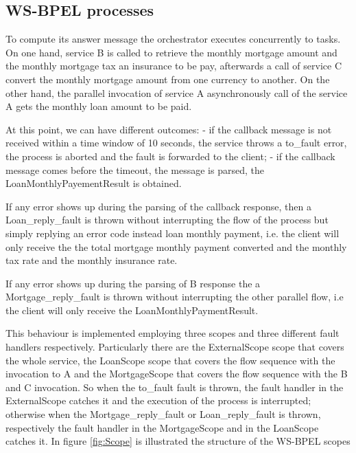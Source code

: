 \documentclass[
10pt, %
a4paper, %
oneside, %
headinclude,footinclude, %
BCOR5mm, %
]{scrartcl}
\begin{document}
\subsection{WS-BPEL processes}
To compute its answer message the orchestrator executes concurrently to
tasks. On one hand, service B is called to retrieve the monthly mortgage
amount and the monthly mortgage tax an insurance to be pay, afterwards a
call of service C convert the monthly mortgage amount from one currency
to another. On the other hand, the parallel invocation of service A asynchronously
call of the service A gets the monthly loan amount to be paid.


At this point, we can have different outcomes: - if the callback message
is not received within a time window of 10 seconds, the service throws
a to\_fault error, the process is aborted and the fault is forwarded to the
client; - if the callback message comes before the timeout, the message is
parsed, the LoanMonthlyPayementResult is obtained. 

If any error shows up during the parsing of the callback response, then a Loan\_reply\_fault is
thrown without interrupting the flow of the process but simply replying
an error code instead loan monthly payment, i.e. the client will only receive
the the total mortgage monthly payment converted and the monthly tax rate
and the monthly insurance rate.


If any error shows up during the parsing of B response the a Mortgage\_reply\_fault
is thrown without interrupting the other parallel flow, i.e the client will only
receive the LoanMonthlyPaymentResult.


This behaviour is implemented employing three scopes and three different
fault handlers respectively. Particularly there are the ExternalScope
scope that covers the whole service, the LoanScope scope that covers the
flow sequence with the invocation to A and the MortgageScope that covers
the flow sequence with the B and C invocation. So when the to\_fault fault
is thrown, the fault handler in the ExternalScope catches it and the execution
of the process is interrupted; otherwise when the Mortgage\_reply\_fault
or Loan\_reply\_fault is thrown, respectively the fault handler in the MortgageScope
and in the LoanScope catches it. In figure \ref{fig:Scope} is illustrated the structure of the WS-BPEL scopes
\end{document}
